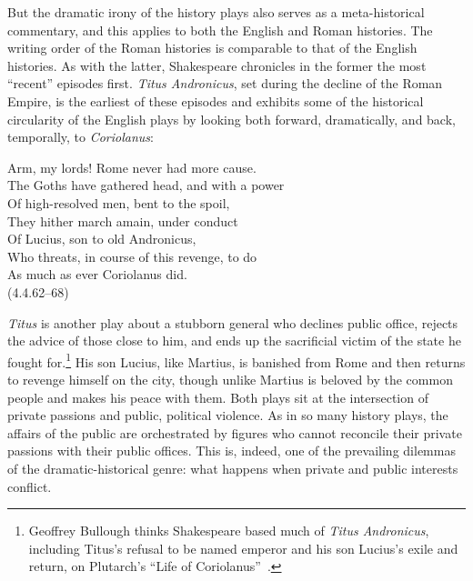 But the dramatic irony of the history plays also serves as a meta-historical commentary, and this applies to both the English and Roman histories.
The writing order of the Roman histories is comparable to that of the English histories.
As with the latter, Shakespeare chronicles in the former the most ``recent'' episodes first.
\emph{Titus Andronicus}, set during the decline of the Roman Empire, is the earliest of these episodes and exhibits some of the historical circularity of the English plays by looking both forward, dramatically, and back, temporally, to \emph{Coriolanus}:
\begin{vq}
Arm, my lords! Rome never had more cause.\\
The Goths have gathered head, and with a power\\
Of high-resolved men, bent to the spoil,\\
They hither march amain, under conduct\\
Of Lucius, son to old Andronicus,\\
Who threats, in course of this revenge, to do\\
As much as ever Coriolanus did.\\
\hfill(4.4.62--68)
\end{vq}
\emph{Titus} is another play about a stubborn general who declines public office, rejects the advice of those close to him, and ends up the sacrificial victim of the state he fought for.\footnote{Geoffrey Bullough thinks Shakespeare based much of \emph{Titus Andronicus}, including Titus's refusal to be named emperor and his son Lucius's exile and return, on Plutarch's ``Life of Coriolanus''~\cite[6:24]{bullough_narrative_1957}.} 
His son Lucius, like Martius, is banished from Rome and then returns to revenge himself on the city, though unlike Martius is beloved by the common people and makes his peace with them.
Both plays sit at the intersection of private passions and public, political violence.
As in so many history plays, the affairs of the public are orchestrated by figures who cannot reconcile their private passions with their public offices.
This is, indeed, one of the prevailing dilemmas of the dramatic-historical genre: what happens when private and public interests conflict.

